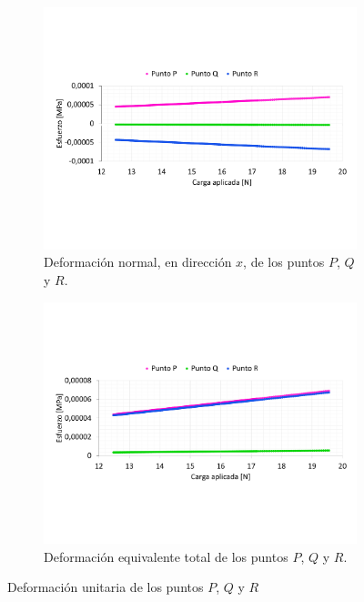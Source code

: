 \begin{figure}[p]
\centering
	\begin{subfigure}{1\linewidth}
		\centering
		\includegraphics[width=\linewidth, trim={1cm 5cm 0cm 5cm},clip]{Imagenes/def_normal.pdf}
		\caption{Deformación normal, en dirección $x$, de los puntos $P$, $Q$ y $R$.}
		\label{fig:def_normal201}
	\end{subfigure}
		\begin{subfigure}{1\linewidth}
		\centering
		\includegraphics[width=\linewidth, trim={1cm 5cm 0cm 5cm},clip]{Imagenes/def_vm.pdf}
		\caption{Deformación equivalente total de los puntos $P$, $Q$ y $R$.}
		\label{fig:def_vm201}
	\end{subfigure}
\caption{Deformación unitaria de los puntos $P$, $Q$ y $R$  }
\label{fig:def_201}
\end{figure}

